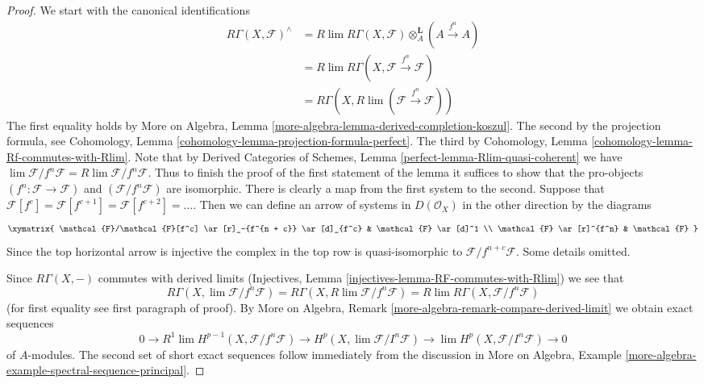 \begin{proof}
We start with the canonical identifications
\begin{align*}
R\Gamma(X, \mathcal{F})^\wedge
& =
R\lim R\Gamma(X, \mathcal{F}) \otimes_A^\mathbf{L} (A \xrightarrow{f^n} A) \\
& =
R\lim R\Gamma(X, \mathcal{F} \xrightarrow{f^n} \mathcal{F}) \\
& =
R\Gamma(X, R\lim (\mathcal{F} \xrightarrow{f^n} \mathcal{F}))
\end{align*}
The first equality holds by
More on Algebra, Lemma \ref{more-algebra-lemma-derived-completion-koszul}.
The second by the projection formula, see 
Cohomology, Lemma \ref{cohomology-lemma-projection-formula-perfect}.
The third by Cohomology, Lemma
\ref{cohomology-lemma-Rf-commutes-with-Rlim}.
Note that by
Derived Categories of Schemes, Lemma \ref{perfect-lemma-Rlim-quasi-coherent}
we have
$\lim \mathcal{F}/f^n\mathcal{F} = R\lim \mathcal{F}/f^n \mathcal{F}$.
Thus to finish the proof of the first statement of the lemma it suffices to
show that the pro-objects $(f^n : \mathcal{F} \to \mathcal{F})$
and $(\mathcal{F}/f^n \mathcal{F})$ are isomorphic. There is clearly
a map from the first system to the second. Suppose that
$\mathcal{F}[f^c] = \mathcal{F}[f^{c + 1}] = \mathcal{F}[f^{c + 2}] = \ldots$.
Then we can define an arrow of systems in $D(\mathcal{O}_X)$
in the other direction by the diagrams
$$
\xymatrix{
\mathcal{F}/\mathcal{F}[f^c] \ar[r]_-{f^{n + c}} \ar[d]_{f^c} &
\mathcal{F} \ar[d]^1 \\
\mathcal{F} \ar[r]^{f^n} & \mathcal{F}
}
$$
Since the top horizontal arrow is injective the complex
in the top row is quasi-isomorphic to $\mathcal{F}/f^{n + c}\mathcal{F}$.
Some details omitted.

\medskip\noindent
Since $R\Gamma(X, -)$ commutes with derived limits
(Injectives, Lemma \ref{injectives-lemma-RF-commutes-with-Rlim})
we see that
$$
R\Gamma(X, \lim \mathcal{F}/f^n\mathcal{F}) =
R\Gamma(X, R\lim \mathcal{F}/f^n\mathcal{F}) =
R\lim R\Gamma(X, \mathcal{F}/f^n\mathcal{F})
$$
(for first equality see first paragraph of proof).
By More on Algebra, Remark \ref{more-algebra-remark-compare-derived-limit}
we obtain exact sequences
$$
0 \to
R^1\lim H^{p - 1}(X, \mathcal{F}/f^n\mathcal{F}) \to
H^p(X, \lim \mathcal{F}/I^n\mathcal{F}) \to
\lim H^p(X, \mathcal{F}/I^n\mathcal{F}) \to 0
$$
of $A$-modules. The second set of short exact sequences follow immediately
from the discussion in More on Algebra, Example
\ref{more-algebra-example-spectral-sequence-principal}.
\end{proof}








